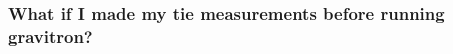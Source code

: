 \documentclass{pfpe-manual}
\begin{document}

\subsubsection{What if I made my tie measurements before running gravitron?}
\label{later}
%
%
%
\end{document}
